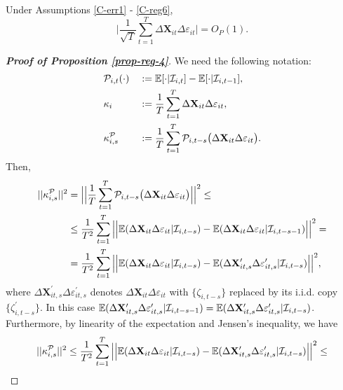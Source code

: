 \documentclass[a4paper,12pt]{article}
\begin{document}
\begin{prop}\label{prop-reg-4}
Under Assumptions \ref{C-err1} - \ref{C-reg6},
\[ \Big| \frac{1}{\sqrt{T}}\sum_{t=1}^T \Delta \mathbf{X}_{it}\Delta \varepsilon_{it} \Big| = O_P(1).
\]
\end{prop}

\begin{proof}[\textnormal{\textbf{Proof of Proposition \ref{prop-reg-4}}}]
We need the following notation:
\begin{alignat*}{2}
&\mathcal{P}_{i,t}(\cdot) &&:= \mathbb{E}[\cdot|\mathcal{I}_{i, t}] -\mathbb{E}[\cdot|\mathcal{I}_{i, t-1}], \\
&\kappa_{i} && := \frac{1}{T}\sum_{t=1}^T  \Delta \mathbf{X}_{it}\Delta \varepsilon_{it}, \\
&\kappa_{i, s}^{\mathcal{P}} && := \frac{1}{T}\sum_{t=1}^T \mathcal{P}_{i, t-s}\big( \Delta \mathbf{X}_{it}\Delta \varepsilon_{it}\big).
\end{alignat*}
Then,
\begin{align*}
||\kappa_{i, s}^{\mathcal{P}}||^2 &= \Big|\Big| \frac{1}{T}\sum_{t=1}^T \mathcal{P}_{i, t-s}\big( \Delta \mathbf{X}_{it}\Delta \varepsilon_{it}\big) \Big|\Big|^2 \leq\\
&\leq \frac{1}{T^2} \sum_{t=1}^T \Big|\Big| \mathbb{E} (\Delta \mathbf{X}_{it}\Delta \varepsilon_{it}|\mathcal{I}_{i, t-s}) -\mathbb{E} (\Delta \mathbf{X}_{it}\Delta \varepsilon_{it}|\mathcal{I}_{i, t-s-1}) \Big|\Big|^2 =\\
&= \frac{1}{T^2} \sum_{t=1}^T \Big|\Big| \mathbb{E} (\Delta \mathbf{X}_{it}\Delta \varepsilon_{it}|\mathcal{I}_{i, t-s}) -\mathbb{E} (\Delta \mathbf{X}_{it, s}^\prime\Delta \varepsilon_{it, s}^\prime|\mathcal{I}_{i, t-s}) \Big|\Big|^2,
\end{align*}
where $\Delta \mathbf{X}_{it, s}^\prime\Delta \varepsilon_{it, s}^\prime$ denotes $\Delta \mathbf{X}_{it}\Delta \varepsilon_{it}$ with $\{\zeta_{i, t-s}\}$ replaced by its i.i.d. copy $\{\zeta_{i, t-s}^\prime\}$. In this case $\mathbb{E} (\Delta \mathbf{X}_{it, s}^\prime\Delta \varepsilon_{it, s}^\prime|\mathcal{I}_{i, t-s -1}) = \mathbb{E} (\Delta \mathbf{X}_{it, s}^\prime\Delta \varepsilon_{it, s}^\prime|\mathcal{I}_{i, t-s})$. Furthermore, by linearity of the expectation and Jensen's inequality, we have 
\begin{align*}
||\kappa_{i, s}^{\mathcal{P}}||^2 &\leq \frac{1}{T^2} \sum_{t=1}^T \Big|\Big| \ex (\Delta \mathbf{X}_{it}\Delta \varepsilon_{it}|\mathcal{I}_{i, t-s}) -\ex (\Delta \mathbf{X}_{it, s}^\prime\Delta \varepsilon_{it, s}^\prime|\mathcal{I}_{i, t-s}) \Big|\Big|^2 \leq \\

\end{align*}
\end{proof}
\end{document}

